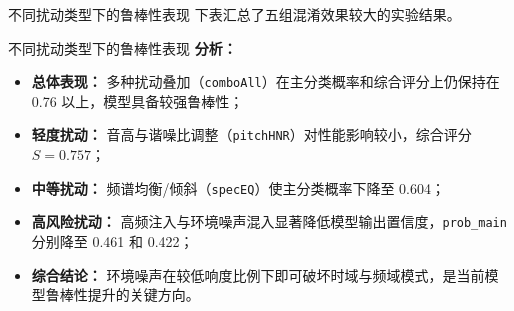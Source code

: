 \documentclass[aspectratio=169]{beamer}
\begin{document}
\begin{frame}{不同扰动类型下的鲁棒性表现}
下表汇总了五组混淆效果较大的实验结果。
\small
\begin{table}[h]
\centering
\caption{不同扰动类型下主分类概率与综合评分均值对比}
\label{tab:family-stats}
\end{table}
\end{frame}
\begin{frame}{不同扰动类型下的鲁棒性表现}
\textbf{分析：}
\begin{itemize}
  \item \textbf{总体表现：} 多种扰动叠加（\texttt{comboAll}）在主分类概率和综合评分上仍保持在 0.76 以上，模型具备较强鲁棒性；
  \item \textbf{轻度扰动：} 音高与谐噪比调整（\texttt{pitchHNR}）对性能影响较小，综合评分 $S=0.757$；
  \item \textbf{中等扰动：} 频谱均衡/倾斜（\texttt{specEQ}）使主分类概率下降至 0.604；
  \item \textbf{高风险扰动：} 高频注入与环境噪声混入显著降低模型输出置信度，\texttt{prob\_main} 分别降至 0.461 和 0.422；
  \item \textbf{综合结论：} 环境噪声在较低响度比例下即可破坏时域与频域模式，是当前模型鲁棒性提升的关键方向。
\end{itemize}

\end{frame}
\end{document}
